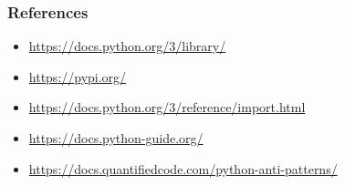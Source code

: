 \documentclass[9pt]{beamer}
\begin{document}
\begin{frame}
  \frametitle{References}
  \scriptsize
  \begin{itemize}
  \item \url{https://docs.python.org/3/library/}
  \item \url{https://pypi.org/}
  \item \url{https://docs.python.org/3/reference/import.html}
  \item \url{https://docs.python-guide.org/}
  \item \url{https://docs.quantifiedcode.com/python-anti-patterns/}
  \end{itemize}
\end{frame}
\end{document}
